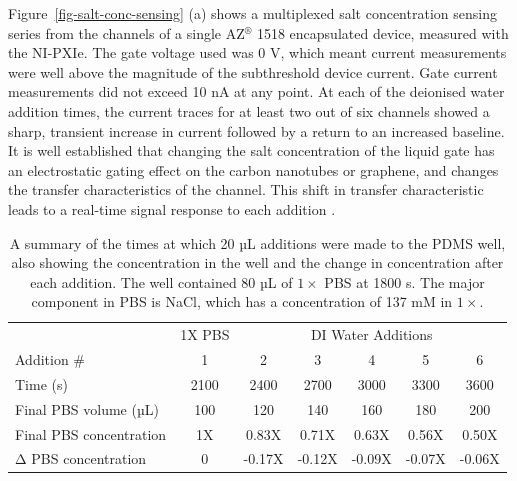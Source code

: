 \documentclass[
  a4paper,
]{scrbook}
\begin{document}
Figure~\ref{fig-salt-conc-sensing} (a) shows a multiplexed salt
concentration sensing series from the channels of a single
AZ\(^\circledR\) 1518 encapsulated device, measured with the NI-PXIe.
The gate voltage used was 0 V, which meant current measurements were
well above the magnitude of the subthreshold device current. Gate
current measurements did not exceed 10 nA at any point. At each of the
deionised water addition times, the current traces for at least two out
of six channels showed a sharp, transient increase in current followed
by a return to an increased baseline. It is well established that
changing the salt concentration of the liquid gate has an electrostatic
gating effect on the carbon nanotubes or graphene, and changes the
transfer characteristics of the channel. This shift in transfer
characteristic leads to a real-time signal response to each addition
\autocite{Heller2009,Heller2010,Kireev2017}.

\hypertarget{tbl-salt-conc-series}{}
\begin{longtable}[t]{lcccccc}
\caption{\label{tbl-salt-conc-series}A summary of the times at which 20 µL additions were made to the PDMS
well, also showing the concentration in the well and the change in
concentration after each addition. The well contained 80 µL of
\(1 \times\) PBS at 1800 s. The major component in PBS is NaCl, which
has a concentration of 137 mM in \(1 \times\). }\tabularnewline

\toprule
\multicolumn{1}{c}{ } & \multicolumn{1}{c}{1X PBS} & \multicolumn{5}{c}{DI Water Additions} \\
\cmidrule(l{3pt}r{3pt}){2-2} \cmidrule(l{3pt}r{3pt}){3-7}
Addition \# & 1 & 2 & 3 & 4 & 5 & 6\\
\midrule
Time (s) & 2100 & 2400 & 2700 & 3000 & 3300 & 3600\\
Final PBS volume (µL) & 100 & 120 & 140 & 160 & 180 & 200\\
Final PBS concentration & 1X & 0.83X & 0.71X & 0.63X & 0.56X & 0.50X\\
Δ PBS concentration & 0 & -0.17X & -0.12X & -0.09X & -0.07X & -0.06X\\
\bottomrule
\end{longtable}
\end{document}
